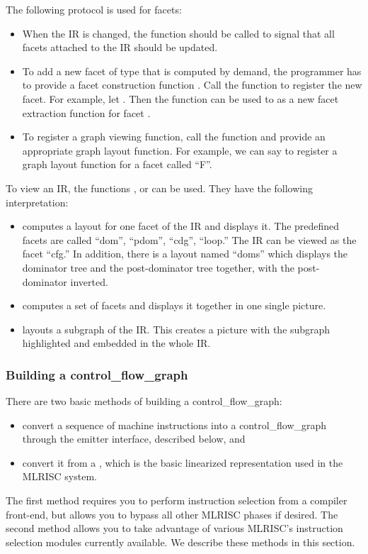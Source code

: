 The following protocol is used for facets:
\begin{itemize}
\item When the IR is changed, 
the function  should be called to 
signal that all facets attached to the IR should be updated.
\item To add a new facet of type  that is computed by demand,
the programmer has to provide a facet construction 
function .  Call the function 
to register the new facet.  For example, let . 
Then the function  can be used to as a new facet extraction
function for facet .
\item To register a graph viewing function, call
the function  and provide an appropriate 
graph layout function.  For example, we can say
 to register a graph layout function
for a facet called ``F''.
\end{itemize}

To view an IR, the functions ,  or
 can be used.  They have the following interpretation:
\begin{itemize}
\item {} computes a layout for one facet of the IR and displays
it.  The predefined facets are called
``dom'', ``pdom'', ``cdg'', ``loop.''  The IR can be
viewed as the facet ``cfg.'' In addition, there is a layout
named ``doms'' which displays the dominator tree and the post-dominator
tree together, with the post-dominator inverted.
\item {} computes a set of facets and displays it together
in one single picture.
\item {} layouts a subgraph of the IR.
This creates a picture with the subgraph highlighted and embedded
in the whole IR.
\end{itemize}

\subsubsection{Building a control_flow_graph}

There are two basic methods of building a control_flow_graph:
\begin{itemize}
\item convert a sequence of machine instructions
into a control_flow_graph through the emitter interface, described below, and 
\item convert it from a , which is
the basic linearized representation used in the MLRISC system.
\end{itemize}
The first method requires you to perform instruction selection
from a compiler front-end, but allows you to bypass all other
MLRISC phases if desired.  The second method allows you
to take advantage of various MLRISC's instruction selection modules
currently available.  We describe these methods in this section.

